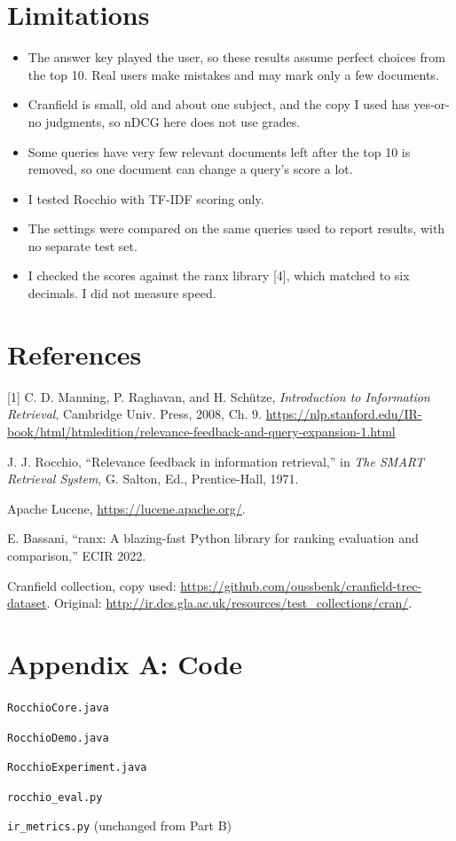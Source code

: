 \section{Limitations}
\begin{itemize}
\item The answer key played the user, so these results assume perfect choices from the top 10. Real users make mistakes and may mark only a few documents.
\item Cranfield is small, old and about one subject, and the copy I used has yes-or-no judgments, so nDCG here does not use grades.
\item Some queries have very few relevant documents left after the top 10 is removed, so one document can change a query's score a lot.
\item I tested Rocchio with TF-IDF scoring only.
\item The settings were compared on the same queries used to report results, with no separate test set.
\item I checked the scores against the ranx library [4], which matched to six decimals. I did not measure speed.
\end{itemize}

\section*{References}
{\small
[1] C. D. Manning, P. Raghavan, and H. Sch\"utze, \emph{Introduction to Information Retrieval}, Cambridge Univ. Press, 2008, Ch. 9. \url{https://nlp.stanford.edu/IR-book/html/htmledition/relevance-feedback-and-query-expansion-1.html}\par
[2] J. J. Rocchio, ``Relevance feedback in information retrieval,'' in \emph{The SMART Retrieval System}, G. Salton, Ed., Prentice-Hall, 1971.\par
[3] Apache Lucene, \url{https://lucene.apache.org/}.\par
[4] E. Bassani, ``ranx: A blazing-fast Python library for ranking evaluation and comparison,'' ECIR 2022.\par
[5] Cranfield collection, copy used: \url{https://github.com/oussbenk/cranfield-trec-dataset}. Original: \url{http://ir.dcs.gla.ac.uk/resources/test_collections/cran/}.\par
}

\clearpage\appendix\section*{Appendix A: Code}
\texttt{RocchioCore.java}

\texttt{RocchioDemo.java}

\texttt{RocchioExperiment.java}

\texttt{rocchio\_eval.py}

\texttt{ir\_metrics.py} (unchanged from Part B)



